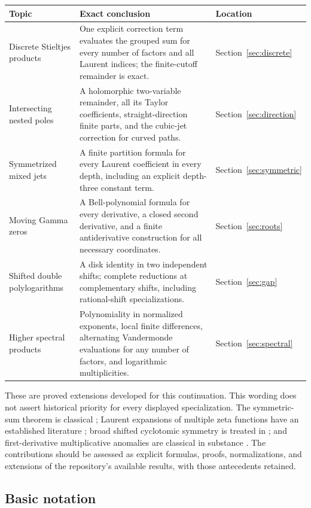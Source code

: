\begin{longtable}{@{}>{\raggedright\arraybackslash}p{}>{\raggedright\arraybackslash}p{}>{\raggedright\arraybackslash}p{}@{}}
\toprule Topic & Exact conclusion & Location\\\midrule
\endhead
Discrete Stieltjes products & One explicit correction term evaluates the
grouped sum for every number of factors and all Laurent indices; the
finite-cutoff remainder is exact. & Section~\ref{sec:discrete}\\[4pt]
Intersecting nested poles & A holomorphic two-variable remainder, all its
Taylor coefficients, straight-direction finite parts, and the cubic-jet
correction for curved paths. & Section~\ref{sec:direction}\\[4pt]
Symmetrized mixed jets & A finite partition formula for every Laurent
coefficient in every depth, including an explicit depth-three constant
term. & Section~\ref{sec:symmetric}\\[4pt]
Moving Gamma zeros & A Bell-polynomial formula for every derivative, a
closed second derivative, and a finite antiderivative construction for
all necessary coordinates. & Section~\ref{sec:roots}\\[4pt]
Shifted double polylogarithms & A disk identity in two independent shifts;
complete reductions at complementary shifts, including rational-shift
specializations. & Section~\ref{sec:gap}\\[4pt]
Higher spectral products & Polynomiality in normalized exponents, local
finite differences, alternating Vandermonde evaluations for any number
of factors, and logarithmic multiplicities. & Section~\ref{sec:spectral}\\
\bottomrule
\end{longtable}

These are proved extensions developed for this continuation. This wording
does not assert historical priority for every displayed specialization.
The symmetric-sum theorem is classical \cite{hoffman}; Laurent expansions
of multiple zeta functions have an established literature
\cite{mow,guozhang}; broad shifted cyclotomic symmetry is treated in
\cite{rui,xu}; and first-derivative multiplicative anomalies are classical
in substance \cite{dowker,gurel,mizuno}. The contributions should be
assessed as explicit formulas, proofs, normalizations, and extensions of
the repository's available results, with those antecedents retained.

\subsection{Basic notation}

